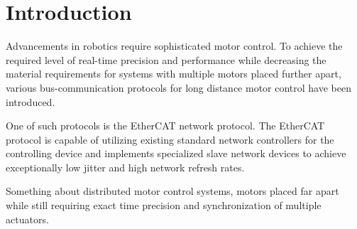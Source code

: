 \section{Introduction}

Advancements in robotics require sophisticated motor control.
To achieve the required level of real-time precision and performance while decreasing the material requirements for systems with multiple motors placed further apart, various bus-communication protocols for long distance motor control have been introduced. 

One of such protocols is the EtherCAT network protocol.
The EtherCAT protocol is capable of utilizing existing standard network controllers for the controlling device and implements specialized slave network devices to achieve exceptionally low jitter and high network refresh rates. 

Something about distributed motor control systems, motors placed far apart while still requiring exact time precision and synchronization of multiple actuators. 
